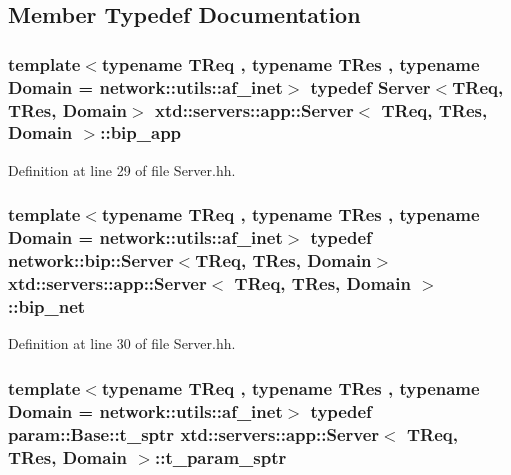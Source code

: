 \subsection{Member Typedef Documentation}
\hypertarget{classxtd_1_1servers_1_1app_1_1Server_a6159422bbffe0fd3d02eb21c4e61011e}{
\subsubsection[{bip\-\_\-app}]{\setlength{\rightskip}{0pt plus 5cm}template$<$typename T\-Req , typename T\-Res , typename Domain  = network\-::utils\-::af\-\_\-inet$>$ typedef {\bf Server}$<$T\-Req, T\-Res, Domain$>$ {\bf xtd\-::servers\-::app\-::\-Server}$<$ T\-Req, T\-Res, Domain $>$\-::{\bf bip\-\_\-app}\hspace{0.3cm}{\ttfamily [protected]}}}\label{classxtd_1_1servers_1_1app_1_1Server_a6159422bbffe0fd3d02eb21c4e61011e}


Definition at line 29 of file Server.\-hh.

\hypertarget{classxtd_1_1servers_1_1app_1_1Server_a7254e9a899be59bbe8ea13ca127108dc}{
\subsubsection[{bip\-\_\-net}]{\setlength{\rightskip}{0pt plus 5cm}template$<$typename T\-Req , typename T\-Res , typename Domain  = network\-::utils\-::af\-\_\-inet$>$ typedef network\-::bip\-::\-Server$<$T\-Req, T\-Res, Domain$>$ {\bf xtd\-::servers\-::app\-::\-Server}$<$ T\-Req, T\-Res, Domain $>$\-::{\bf bip\-\_\-net}\hspace{0.3cm}{\ttfamily [protected]}}}\label{classxtd_1_1servers_1_1app_1_1Server_a7254e9a899be59bbe8ea13ca127108dc}


Definition at line 30 of file Server.\-hh.

\hypertarget{classxtd_1_1servers_1_1app_1_1Server_a72a3c0bea3f2fc2e87b98e09e54fc9ac}{
\subsubsection[{t\-\_\-param\-\_\-sptr}]{\setlength{\rightskip}{0pt plus 5cm}template$<$typename T\-Req , typename T\-Res , typename Domain  = network\-::utils\-::af\-\_\-inet$>$ typedef {\bf param\-::\-Base\-::t\-\_\-sptr} {\bf xtd\-::servers\-::app\-::\-Server}$<$ T\-Req, T\-Res, Domain $>$\-::{\bf t\-\_\-param\-\_\-sptr}\hspace{0.3cm}{\ttfamily [protected]}}}\label{classxtd_1_1servers_1_1app_1_1Server_a72a3c0bea3f2fc2e87b98e09e54fc9ac}


